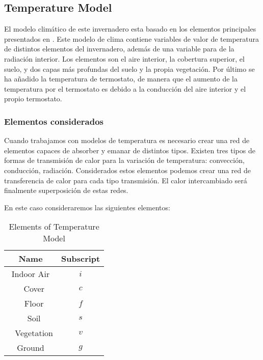\documentclass[5p,twocolumn]{elsarticle}
\begin{document}
\subsection{Temperature Model}

El modelo climático de este invernadero esta basado en los elementos principales presentados en \cite{Vanthoor2011}. Este modelo de clima contiene variables de valor de temperatura de distintos elementos  del invernadero, además de una variable para de la radiación interior. Los elementos son el aire interior, la cobertura superior, el suelo, y dos capas más profundas del suelo y la propia vegetación. Por último se ha añadido la temperatura de termostato, de manera que el aumento de la temperatura por el termostato es debido a la conducción del aire interior y el propio termostato. 


\subsubsection{Elementos considerados}

Cuando trabajamos con modelos de temperatura es necesario crear una red de elementos capaces de absorber y emanar de distintos tipos. Existen tres tipos de formas de transmisión de calor para la variación de temperatura: convección, conducción, radiación. Considerados estos  elementos  podemos crear una red de transferencia de calor para cada tipo transmisión. El calor intercambiado será finalmente superposición de estas redes. 

En este caso consideraremos las siguientes elementos: 




\begin{table}[ht!]
    \centering
    \small
    \begin{tabular}{cc}
        \textbf{Name} & \textbf{Subscript} \\ \hline
        Indoor Air    & $i$  \\ 
        Cover         & $c$  \\ 
        Floor         & $f$  \\ 
        Soil          & $s$  \\ 
        Vegetation    & $v$  \\
        Ground        & $g$ \\ \hline
    \end{tabular}
    \caption{Elements of Temperature Model}
\end{table}
\end{document}
